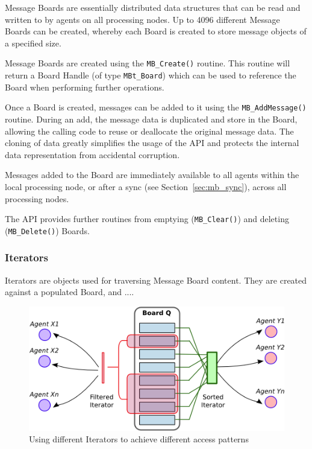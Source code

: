 Message Boards are essentially distributed data structures that can be read and written to by agents on all processing nodes. Up to 4096 different Message Boards can be created, whereby each Board is created to store message objects of a specified size.

Message Boards are created using the \texttt{MB\_Create()} routine. This routine will return a Board Handle (of type \texttt{MBt\_Board}) which can be used to reference the Board when performing further operations.

Once a Board is created, messages can be added to it using the \texttt{MB\_AddMessage()} routine. During an add, the message data is duplicated and store in the Board, allowing the calling code to reuse or deallocate the original message data. The cloning of data greatly simplifies the usage of the API and protects the internal data representation from accidental corruption. 

Messages added to the Board are immediately available to all agents within the local processing node, or after a sync (see Section~\ref{sec:mb_sync}), across all processing nodes.

The API provides further routines from emptying (\texttt{MB\_Clear()}) and deleting  (\texttt{MB\_Delete()}) Boards.

\subsubsection{Iterators}
\label{sec:mb_interators}

Iterators are objects used for traversing Message Board content. They are created against a populated Board, and ....

\begin{figure}[h]
 \centering
  \includegraphics[scale=0.8]{iterator.png}
 \caption{Using different Iterators to achieve different access patterns}
 \label{fig:mb_iterators}
\end{figure}

